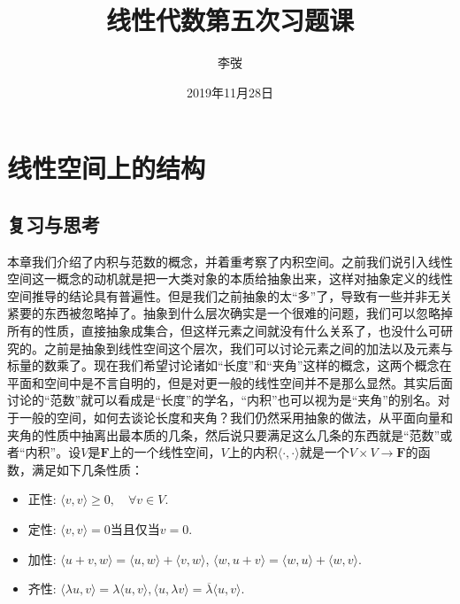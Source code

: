 \documentclass[hyperref,]{ctexart}
\title{线性代数第五次习题课}
\author{李弢}
\date{2019年11月28日}
\providecommand{\tightlist}{%
  \setlength{\itemsep}{0pt}\setlength{\parskip}{0pt}}
\begin{document}
\maketitle

{
\setcounter{tocdepth}{2}
\tableofcontents
}
\def\vec{\overrightarrow} \def\bfF{\mathbf{F}} \def\calP{\mathcal{P}}
\def\calC{\mathcal{C}} \def\calL{\mathcal{L}} \def\calM{\mathcal{M}}
\def\R{\mathbb{R}} \def\C{\mathbb{C}} \def\N{\mathbb{N}}
\def\Z{\mathbb{Z}} \def\span{\mathrm{span}\,} \def\dim{\mathrm{dim}\,}
\def\Null{\mathrm{null}\,} \def\range{\mathrm{range}\,}
\def\rank{\mathrm{rank}\,} \def\proj{\mathrm{Proj}\,}
\def\st{\mathrm{s.t.}} \def\d{\mathrm{d}\,}

\section{线性空间上的结构}\label{ux7ebfux6027ux7a7aux95f4ux4e0aux7684ux7ed3ux6784}

\subsection{复习与思考}\label{ux590dux4e60ux4e0eux601dux8003}

本章我们介绍了内积与范数的概念，并着重考察了内积空间。之前我们说引入线性空间这一概念的动机就是把一大类对象的本质给抽象出来，这样对抽象定义的线性空间推导的结论具有普遍性。但是我们之前抽象的太``多''了，导致有一些并非无关紧要的东西被忽略掉了。抽象到什么层次确实是一个很难的问题，我们可以忽略掉所有的性质，直接抽象成集合，但这样元素之间就没有什么关系了，也没什么可研究的。之前是抽象到线性空间这个层次，我们可以讨论元素之间的加法以及元素与标量的数乘了。现在我们希望讨论诸如``长度''和``夹角''这样的概念，这两个概念在平面和空间中是不言自明的，但是对更一般的线性空间并不是那么显然。其实后面讨论的``范数''就可以看成是``长度''的学名，``内积''也可以视为是``夹角''的别名。对于一般的空间，如何去谈论长度和夹角？我们仍然采用抽象的做法，从平面向量和夹角的性质中抽离出最本质的几条，然后说只要满足这么几条的东西就是``范数''或者``内积''。设\(V\)是\(\bfF\)上的一个线性空间，\(V\)上的内积\(\langle\cdot,\cdot\rangle\)就是一个\(V\times V\rightarrow \bfF\)的函数，满足如下几条性质：

\begin{itemize}
\tightlist
\item
  正性: \(\langle v,v\rangle\ge 0,\quad \forall v\in V.\)
\item
  定性: \(\langle v,v\rangle =0\)当且仅当\(v=0\).
\item
  加性:
  \(\langle u+v,w\rangle = \langle u,w\rangle+\langle v,w\rangle\),
  \(\langle w,u+v\rangle = \langle w,u\rangle+\langle w,v\rangle\).
\item
  齐性:
  \(\langle \lambda u, v\rangle = \lambda \langle u ,v\rangle,\langle u,\lambda v\rangle = \overline{\lambda} \langle u ,v\rangle\).
\end{itemize}
\end{document}
